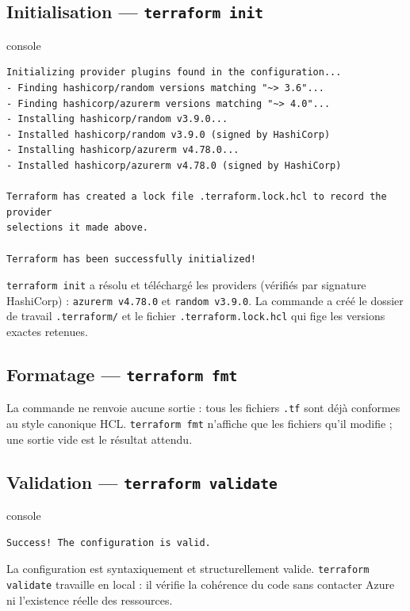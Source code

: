 \documentclass[11pt,a4paper]{article}
\newcommand{\code}[1]{\texttt{#1}}
\begin{document}
\subsection{Initialisation — \code{terraform init}}
\begin{codebox}{console}
\begin{Verbatim}
Initializing provider plugins found in the configuration...
- Finding hashicorp/random versions matching "~> 3.6"...
- Finding hashicorp/azurerm versions matching "~> 4.0"...
- Installing hashicorp/random v3.9.0...
- Installed hashicorp/random v3.9.0 (signed by HashiCorp)
- Installing hashicorp/azurerm v4.78.0...
- Installed hashicorp/azurerm v4.78.0 (signed by HashiCorp)

Terraform has created a lock file .terraform.lock.hcl to record the provider
selections it made above.

Terraform has been successfully initialized!
\end{Verbatim}
\end{codebox}
\code{terraform init} a résolu et téléchargé les providers (vérifiés par signature HashiCorp) :
\code{azurerm v4.78.0} et \code{random v3.9.0}. La commande a créé le dossier de travail \code{.terraform/}
et le fichier \code{.terraform.lock.hcl} qui fige les versions exactes retenues.

\subsection{Formatage — \code{terraform fmt}}
La commande ne renvoie aucune sortie : tous les fichiers \code{.tf} sont déjà conformes au style canonique
HCL. \code{terraform fmt} n'affiche que les fichiers qu'il modifie ; une sortie vide est le résultat attendu.

\subsection{Validation — \code{terraform validate}}
\begin{codebox}{console}
\begin{Verbatim}
Success! The configuration is valid.
\end{Verbatim}
\end{codebox}
La configuration est syntaxiquement et structurellement valide. \code{terraform validate} travaille en local :
il vérifie la cohérence du code sans contacter Azure ni l'existence réelle des ressources.
\end{document}
